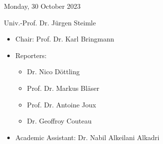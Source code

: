 
 Monday, 30 October 2023

 Univ.-Prof. Dr. J\"urgen Steimle

\begin{itemize}
    \item Chair:  Prof. Dr. Karl Bringmann
    \item Reporters: \begin{itemize}
        \item Dr. Nico D\"ottling
        \item Prof. Dr. Markus Bl\"aser
        \item Prof. Dr. Antoine Joux
        \item Dr. Geoffroy Couteau
    \end{itemize}
    \item Academic Assistant: Dr. Nabil Alkeilani Alkadri
\end{itemize}

